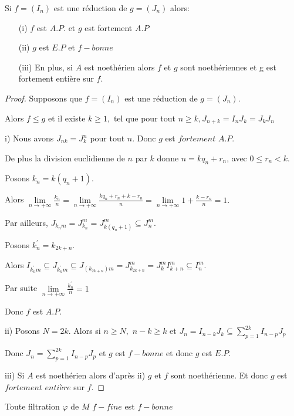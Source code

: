 \begin{maproposition}
	Si $f=(I_n)$ est une réduction de $g=(J_n)$ alors:
	\begin{enumerate}
		\item[(i)] $f$ est $A.P.$ et $g$ est fortement $A.P$
		\item[(ii)] $g$ est $E.P$ et $f-bonne$
		\item[(iii)] En plus, si $A$ est noethérien alors $f$ et $g$ sont noethériennes et g est fortement entière sur $f$.
	\end{enumerate}
\end{maproposition}
\begin{proof}
	Supposons que $f=(I_{n})$ est une réduction de $g=(J_{n}).$
	
	Alors $f\leq g$ et il existe $k\geq 1,$ tel que pour tout $n\geq k,J_{n+k}=I_{n}J_{k}=J_{k}J_{n}$
	
	i) Nous avons $J_{nk}=J_{k}^{n}$ pour tout $n.$ Donc $g$ est $fortement$ $A.P.$
	
	De plus la division euclidienne de $n$ par $k$ donne $n=kq_{n}+r_{n}$, avec $0\leq r_{n}<k.$
	
	Posons $k_{n}=k(q_{n}+1).$
	
	Alors $\underset{n\longrightarrow +\infty }{\lim }\frac{k_{n}}{n}=\underset{n\longrightarrow +\infty }{\lim }\frac{kq_{n}+r_{n}+k-r_{n}}{n}=\underset{n\longrightarrow +\infty }{\lim }1+\frac{k-r_{n}}{n}=1.$
	
	Par ailleurs, $J_{k_{n}m}=J_{k_{n}}^{m}=J_{k(q_{n}+1)}^{m}\subseteq J_{n}^{m}.$
	
	Posons $k_{n}^{\prime }=k_{2k+n}.$
	
	Alors $I_{k_{n}^{\prime }m}\subseteq J_{k_{n}^{\prime }m}\subseteq
	J_{(k_{2k+n})m}=J_{k_{2k+n}}^{m}=J_{k}^{m}I_{k+n}^{m}\subseteq I_{n}^{m}.$
	
	Par suite $\underset{n\longrightarrow +\infty }{\lim }\frac{k_{n}^{\prime }}{n}=1$
	
	Donc $f$ est $A.P.$
	
	
	ii) Posons $N=2k.$ Alors si $n\geq N,$ $n-k\geq k$ et $J_{n}=I_{n-k}J_{k}\subseteq \sum\limits_{p=1}^{2k}I_{n-p}J_{p}$
	
	Donc $J_{n}=\sum\limits_{p=1}^{2k}I_{n-p}J_{p}$ et $g$ est $f-bonne$ et donc $g$ est $E.P.$
	
	iii) Si $A$ est noethérien alors d'après ii) $g$ et $f$ sont noethérienne. Et donc $g$ est $fortement$ $entière$ sur $f.$
	
\end{proof}
\begin{maproposition}
	Toute filtration $\varphi$ de $M$ $f-fine$ est $f-bonne$
\end{maproposition}
